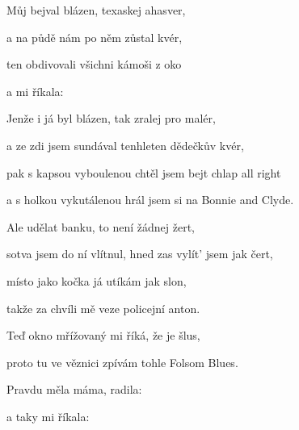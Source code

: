 

\zs
Můj  bejval blázen, texaskej ahasver,

a na půdě nám po něm zůstal  kvér,

ten  obdivovali všichni kámoši z oko

a  mi říkala: 
\ks

\zs
Jenže i já byl blázen, tak zralej pro malér,

a ze zdi jsem sundával tenhleten dědečkův kvér,

pak s kapsou vyboulenou chtěl jsem bejt chlap all right

a s holkou vykutálenou hrál jsem si na Bonnie and Clyde.
\ks

\zs
Ale udělat banku, to není žádnej žert,

sotva jsem do ní vlítnul, hned zas vylít' jsem jak čert,

místo jako kočka já utíkám jak slon,

takže za chvíli mě veze policejní anton.

\ks

\zs
Teď okno mřížovaný mi říká, že je šlus,

proto tu ve věznici zpívám tohle Folsom Blues.

Pravdu měla máma, radila: 

a taky mi říkala: 
\ks

\kp
